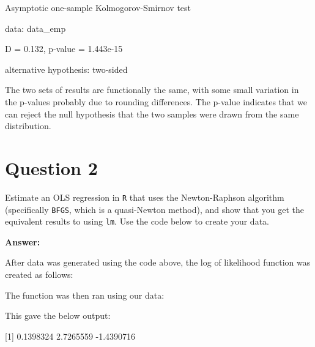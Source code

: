 \documentclass[12pt,letterpaper]{article}
\begin{document}
Asymptotic one-sample Kolmogorov-Smirnov test
\vspace{.5cm}

data:  data\_emp

D = 0.132, p-value = 1.443e-15

alternative hypothesis: two-sided

\vspace{.5cm}

\noindent The two sets of results are functionally the same, with some small variation in the p-values probably due to rounding differences. The p-value indicates that we can reject the null hypothesis that the two samples were drawn from the same distribution.

\vspace{.5cm}

\pagebreak

\section*{Question 2}
\noindent Estimate an OLS regression in \texttt{R} that uses the Newton-Raphson algorithm (specifically \texttt{BFGS}, which is a quasi-Newton method), and show that you get the equivalent results to using \texttt{lm}. Use the code below to create your data.
\vspace{.5cm}
 
\vspace{.5cm}

\noindent
\textbf{Answer:}
\vspace{.5cm}

\noindent After data was generated using the code above, the log of likelihood function was created as follows:

\vspace{.5cm}
 
\vspace{.5cm}

\noindent The function was then ran using our data:

 \vspace{.5cm}
  
 \vspace{.5cm}
 
 \noindent This gave the below output:
 
 \vspace{.5cm}
 [1]  0.1398324  2.7265559 -1.4390716
\vspace{.5cm}
\end{document}

